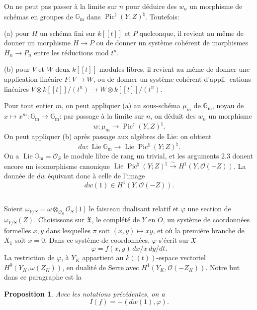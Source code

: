 \documentclass[12pt,a4paper]{article}
\theoremstyle{plain}
\newtheorem{proposition}{Proposition}
\theoremstyle{definition}
\theoremstyle{remark}
\DeclareMathOperator{\Lie}{Lie}
\DeclareMathOperator{\Pic}{Pic}
\newcommand{\OO}{\mathcal{O}}
\newcommand{\Gm}{\mathbb{G}_{\mathrm{m}}}
\providecommand{\Gm}{\mathbb{G}_{\mathrm m}}
\providecommand{\Lie}{\operatorname{Lie}}
\begin{document}
On ne peut pas passer à la limite sur $n$ pour déduire des $w_n$ un morphisme
de schémas en groupes de $\Gm$ dans $\Pic^\natural(Y;Z)^\natural$. Toutefois:

(a) pour $H$ un schéma fini sur $k[[t]]$ et $P$ quelconque, il revient au même de
donner un morphisme $H\to P$ ou de donner un système cohérent de morphismes
$H_n\to P_n$ entre les réductions mod $t^n$.

(b) pour $V$ et $W$ deux $k[[t]]$-modules libres, il revient au même de donner
une application linéaire $F:V\to W$, ou de donner un système cohérent d'appli-
cations linéaires $V\otimes k[[t]]/(t^n)\to W\otimes k[[t]]/(t^n)$.

Pour tout entier $m$, on peut appliquer (a) au sous-schéma $\mu_m$ de $\Gm$, noyau
de $x\mapsto x^m:\Gm\to\Gm$: par passage à la limite sur $n$, on déduit des $w_n$ un
morphisme
\begin{equation}\label{eq:2.4.9}
w:\mu_m\to\Pic^\natural(Y,Z)^\natural.
\end{equation}
On peut appliquer (b) après passage aux algèbres de Lie: on obtient
\begin{equation}\label{eq:2.4.10}
dw:\Lie\Gm\to\Lie\Pic^\natural(Y;Z)^\natural.
\end{equation}
On a $\Lie\Gm=\OO_S$ le module libre de rang un trivial, et les arguments 2.3
donent encore un isomorphisme canonique
$\Lie\Pic^\natural(Y;Z)^\natural\xrightarrow{\sim} H^1(Y,\OO(-Z))$. La donnée de $dw$ équivaut
donc à celle de l'image
\begin{equation}\label{eq:2.4.11}
dw(1)\in H^1(Y,\OO(-Z)).
\end{equation}

\subsection{}

Soient $\omega_{Y/S}=\omega\otimes_{\OO_S}\OO_S[1]$ le faisceau dualisant relatif et $\varphi$ une section de
$\omega_{Y/S}(Z)$. Choisissons sur $\mathfrak{X}$, le complété de $Y$ en $O$, un système de coordonnées
formelles $x,y$ dans lesquelles $\pi$ soit $(x,y)\mapsto xy$, et où la première branche de $X_1$
soit $x=0$. Dans ce système de coordonnées, $\varphi$ s'écrit sur $\mathfrak{X}$
\[
\varphi=f(x,y)\,dx/x\,dy/dt.
\]
La restriction de $\varphi$, à $Y_K$ appartient au $k((t))$-espace vectoriel
$H^0(Y_K,\omega(Z_K))$, en dualité de Serre avec $H^1(Y_K,\OO(-Z_K))$. Notre but dans
ce paragraphe est la

\begin{proposition}\label{prop:2.5}
Avec les notations précédentes, on a
\begin{equation}\label{eq:2.5.1}
I(f)=-(dw(1),\varphi).
\end{equation}
\end{proposition}
\end{document}

